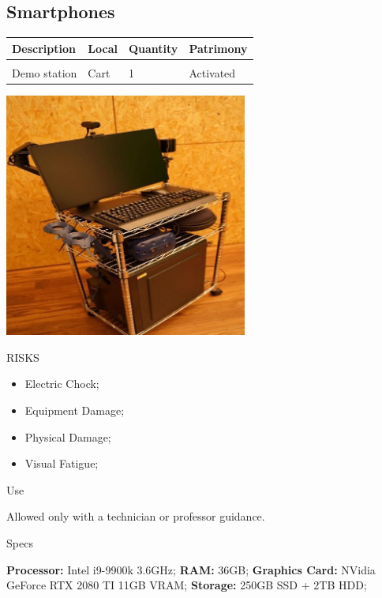 \subsection{Smartphones}
\begin{tabularx}{\textwidth}{ Y  Y  Y  Y }
    \textbf{Description} &  \textbf{Local} &  \textbf{Quantity} & \textbf{Patrimony}\\
    \hline \\
     Demo station & Cart & 1 & Activated
\end{tabularx}
\vspace{1cm}

\begin{multicols}{2}

\includegraphics[width=80mm, keepaspectratio]{imgs/image3.jpg}

\columnbreak

\begin{mdframed}[roundcorner=10pt, linecolor=red, linewidth=2pt]
\vspace{1em}
{\Large {\color{red}RISKS}}
\vspace{1em}

\begin{itemize}
    \item Electric Chock;
    \item Equipment Damage;
    \item Physical Damage;
    \item Visual Fatigue; 
\end{itemize}

\vspace{1em}
\end{mdframed}

\vspace{2em}

{\Large Use}
\vspace{1em}

Allowed only with a technician or professor guidance.
\end{multicols}

{\Large Specs}
\vspace{1em}

\textbf{Processor:} Intel i9-9900k 3.6GHz; \textbf{RAM:} 36GB; \textbf{Graphics Card:} NVidia GeForce RTX 2080 TI 11GB VRAM; \textbf{Storage:} 250GB SSD + 2TB HDD;
\newpage
